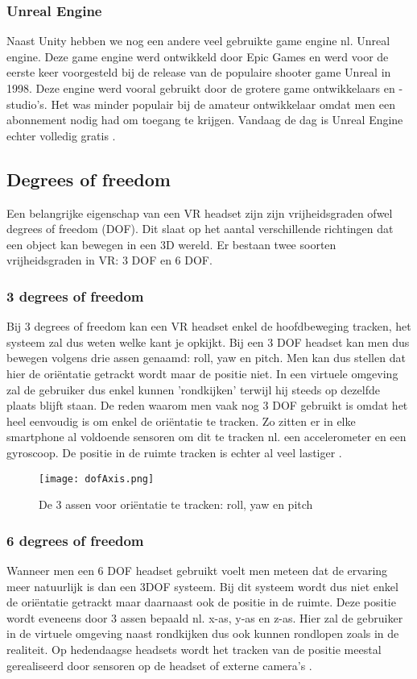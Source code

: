 \subsubsection{Unreal Engine}
Naast Unity hebben we nog een andere veel gebruikte game engine nl. Unreal engine. Deze game engine werd ontwikkeld door Epic Games en werd voor de eerste keer voorgesteld bij de release van de populaire shooter game Unreal in 1998. Deze engine werd vooral gebruikt door de grotere game ontwikkelaars en -studio's. Het was minder populair bij de amateur ontwikkelaar omdat men een abonnement nodig had om toegang te krijgen. Vandaag de dag is Unreal Engine echter volledig gratis \autocite{Sutorcen2016}.

\subsection{Degrees of freedom}

Een belangrijke eigenschap van een VR headset zijn zijn vrijheidsgraden ofwel degrees of freedom (DOF). Dit slaat op het aantal verschillende richtingen dat een object kan bewegen in een 3D wereld. Er bestaan twee soorten vrijheidsgraden in VR: 3 DOF en 6 DOF. 

\subsubsection{3 degrees of freedom}
Bij 3 degrees of freedom kan een VR headset enkel de hoofdbeweging tracken, het systeem zal dus weten welke kant je opkijkt. Bij een 3 DOF headset kan men dus bewegen volgens drie assen genaamd: roll, yaw en pitch. Men kan dus stellen dat hier de oriëntatie getrackt wordt maar de positie niet. In een virtuele omgeving zal de gebruiker dus enkel kunnen 'rondkijken' terwijl hij steeds op dezelfde plaats blijft staan. De reden waarom men vaak nog 3 DOF gebruikt is omdat het heel eenvoudig is om enkel de oriëntatie te tracken. Zo zitten er in elke smartphone al voldoende sensoren om dit te tracken nl. een accelerometer en een gyroscoop. De positie in de ruimte tracken is echter al veel lastiger \autocite{Weis2018}.

\begin{figure}[h]
    \centering
    \texttt{[image: dofAxis.png]}
    \caption{De 3 assen voor oriëntatie te tracken: roll, yaw en pitch \autocite{Weis2018}}
\end{figure}

\subsubsection{6 degrees of freedom}
Wanneer men een 6 DOF headset gebruikt voelt men meteen dat de ervaring meer natuurlijk is dan een 3DOF systeem. Bij dit systeem wordt dus niet enkel de oriëntatie getrackt maar daarnaast ook de positie in de ruimte. Deze positie wordt eveneens door 3 assen bepaald nl. x-as, y-as en z-as. Hier zal de gebruiker in de virtuele omgeving naast rondkijken dus ook kunnen rondlopen zoals in de realiteit. Op hedendaagse headsets wordt het tracken van de positie meestal gerealiseerd door sensoren op de headset of externe camera's \autocite{Weis2018}.
\pagebreak

